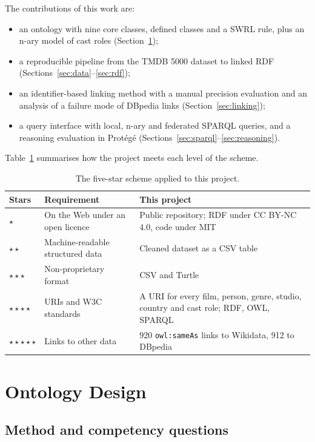 \documentclass[11pt,a4paper]{article}
\newcommand{\code}[1]{\texttt{#1}}
\begin{document}
The contributions of this work are:
\begin{itemize}
  \item an ontology with nine core classes, defined classes and a SWRL rule, plus an n-ary model of cast roles (Section~\ref{sec:ontology});
  \item a reproducible pipeline from the TMDB 5000 dataset to linked RDF (Sections~\ref{sec:data}--\ref{sec:rdf});
  \item an identifier-based linking method with a manual precision evaluation and an analysis of a failure mode of DBpedia links (Section~\ref{sec:linking});
  \item a query interface with local, n-ary and federated SPARQL queries, and a reasoning evaluation in Protégé (Sections~\ref{sec:sparql}--\ref{sec:reasoning}).
\end{itemize}

\noindent Table~\ref{tab:stars} summarises how the project meets each level of the scheme.

\begin{table}[H]
\centering\small
\caption{The five-star scheme applied to this project.}\label{tab:stars}
\begin{tabularx}{\textwidth}{@{}lXX@{}}
\toprule
Stars & Requirement & This project \\
\midrule
$\star$ & On the Web under an open licence & Public repository; RDF under CC BY-NC 4.0, code under MIT \\
$\star\star$ & Machine-readable structured data & Cleaned dataset as a CSV table \\
$\star\star\star$ & Non-proprietary format & CSV and Turtle \\
$\star\star\star\star$ & URIs and W3C standards & A URI for every film, person, genre, studio, country and cast role; RDF, OWL, SPARQL \\
$\star\star\star\star\star$ & Links to other data & 920 \code{owl:sameAs} links to Wikidata, 912 to DBpedia \\
\bottomrule
\end{tabularx}
\end{table}

\section{Ontology Design}\label{sec:ontology}

\subsection{Method and competency questions}
\end{document}
